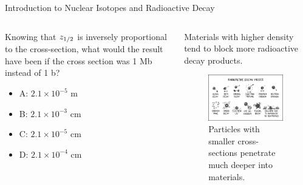 \documentclass{beamer}
\begin{document}
\begin{frame}{Introduction to Nuclear Isotopes and Radioactive Decay}
\begin{columns}[T]
\begin{column}{0.45\textwidth}
\small
Knowing that $z_{\rm 1/2}$ is inversely proportional to the cross-section, what would the result have been if the cross section was 1 Mb instead of 1 b?
\begin{itemize}
\item A: $2.1 \times 10^{-5}$ m
\item B: $2.1 \times 10^{-3}$ cm
\item C: $2.1 \times 10^{-5}$ cm
\item D: $2.1 \times 10^{-4}$ cm
\end{itemize}
\end{column}
\begin{column}{0.55\textwidth}
\footnotesize
Materials with higher density tend to block more radioactive decay products.
\begin{figure}
\centering
\includegraphics[width=0.95\textwidth]{figures/decay_modes.png}
\caption{\label{fig:radio10} Particles with smaller cross-sections penetrate much deeper into materials.}
\end{figure}
\end{column}
\end{columns}
\end{frame}
\end{document}
